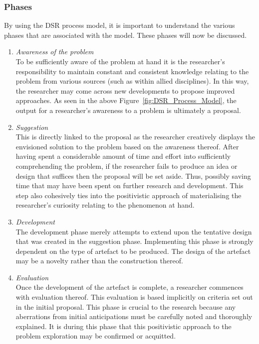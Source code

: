 \subsubsection{Phases}

By using the DSR process model, it is important to understand the various phases that are associated with the model. These phases will now be discussed.\\
\begin{enumerate}[label=\roman*.]
	\item \textit{Awareness of the problem}\\
	To be sufficiently aware of the problem at hand it is the researcher’s responsibility to maintain constant and consistent knowledge relating to the problem from various sources (such as within allied disciplines). In this way, the researcher may come across new developments to propose improved approaches. As seen in the above Figure~\ref{fig:DSR_Process_Model}, the output for a researcher’s awareness to a problem is ultimately a proposal.
	
	\item \textit{Suggestion} \\
	This is directly linked to the proposal as the researcher creatively displays the envisioned solution to the problem based on the awareness thereof. After having spent a considerable amount of time and effort into sufficiently comprehending the problem, if the researcher fails to produce an idea or design that suffices then the proposal will be set aside. Thus, possibly saving time that may have been spent on further research and development.
This step also cohesively ties into the positivistic approach of materialising the researcher’s curiosity relating to the phenomenon at hand.

	\item \textit{Development} \\
	The development phase merely attempts to extend upon the tentative design that was created in the suggestion phase. Implementing this phase is strongly dependent on the type of artefact to be produced. The design of the artefact may be a novelty rather than the construction thereof.
	
	\item \textit{Evaluation} \\
	Once the development of the artefact is complete, a researcher commences with evaluation thereof. This evaluation is based implicitly on criteria set out in the initial proposal. This phase is crucial to the research because any aberrations from initial anticipations must be carefully noted and thoroughly explained. It is during this phase that this positivistic approach to the problem exploration may be confirmed or acquitted. 
	

\end{enumerate}
